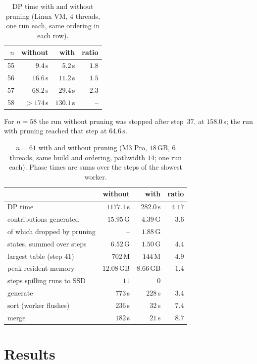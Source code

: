 \documentclass[12pt]{article}
\theoremstyle{definition}
\begin{document}
\begin{table}[H]
\centering
\caption{DP time with and without pruning (Linux VM, $4$ threads, one run
each, same ordering in each row).}
\label{tab:prune}
\begin{tabular}{rrrr}
\toprule
$n$ & without & with & ratio\\
\midrule
55 & $9.4$\,s & $5.2$\,s & $1.8$\\
56 & $16.6$\,s & $11.2$\,s & $1.5$\\
57 & $68.2$\,s & $29.4$\,s & $2.3$\\
58 & $>174$\,s & $130.1$\,s & --\\
\bottomrule
\end{tabular}
\end{table}
\noindent
For $n=58$ the run without pruning was stopped after step~$37$, at $158.0$\,s;
the run with pruning reached that step at $64.6$\,s.

\begin{table}[H]
\centering
\caption{$n=61$ with and without pruning (M3 Pro, $18$\,GB, $6$ threads,
same build and ordering, pathwidth $14$; one run each).
Phase times are sums over the steps of the slowest worker.}
\label{tab:prune61}
\begin{tabular}{lrrr}
\toprule
 & without & with & ratio\\
\midrule
DP time & $1177.1$\,s & $282.0$\,s & $4.17$\\
contributions generated & $15.95$\,G & $4.39$\,G & $3.6$\\
\quad of which dropped by pruning & -- & $1.88$\,G & \\
states, summed over steps & $6.52$\,G & $1.50$\,G & $4.4$\\
largest table (step 41) & $702$\,M & $144$\,M & $4.9$\\
peak resident memory & $12.08$\,GB & $8.66$\,GB & $1.4$\\
steps spilling runs to SSD & $11$ & $0$ & \\
generate & $773$\,s & $228$\,s & $3.4$\\
sort (worker flushes) & $236$\,s & $32$\,s & $7.4$\\
merge & $182$\,s & $21$\,s & $8.7$\\
\bottomrule
\end{tabular}
\end{table}

\section{Results}
\label{sec:results}
\end{document}
